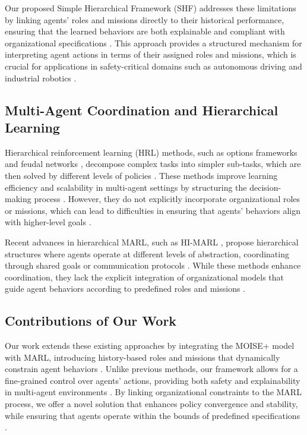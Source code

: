 \documentclass[sigconf,anonymous]{aamas}
\begin{document}
Our proposed Simple Hierarchical Framework (SHF) addresses these limitations by linking agents' roles and missions directly to their historical performance, ensuring that the learned behaviors are both explainable and compliant with organizational specifications \cite{hubner2010moise}. This approach provides a structured mechanism for interpreting agent actions in terms of their assigned roles and missions, which is crucial for applications in safety-critical domains such as autonomous driving and industrial robotics \cite{su2021toward}.

\subsection{Multi-Agent Coordination and Hierarchical Learning}
Hierarchical reinforcement learning (HRL) methods, such as options frameworks \cite{options_hrl_reference} and feudal networks \cite{feudal_rl_reference}, decompose complex tasks into simpler sub-tasks, which are then solved by different levels of policies \cite{foerster2018counterfactual, yang2018mean}. These methods improve learning efficiency and scalability in multi-agent settings by structuring the decision-making process \cite{yang2018mean}. However, they do not explicitly incorporate organizational roles or missions, which can lead to difficulties in ensuring that agents' behaviors align with higher-level goals \cite{hernandez2019survey, hubner2010moise}.

Recent advances in hierarchical MARL, such as HI-MARL \cite{hi_marl_reference}, propose hierarchical structures where agents operate at different levels of abstraction, coordinating through shared goals or communication protocols \cite{foerster2018counterfactual}. While these methods enhance coordination, they lack the explicit integration of organizational models that guide agent behaviors according to predefined roles and missions \cite{hubner2010moise, soule2024}.

\subsection{Contributions of Our Work}
Our work extends these existing approaches by integrating the MOISE+ model with MARL, introducing history-based roles and missions that dynamically constrain agent behaviors \cite{hubner2010moise}. Unlike previous methods, our framework allows for a fine-grained control over agents' actions, providing both safety and explainability in multi-agent environments \cite{ghosal2021explainable}. By linking organizational constraints to the MARL process, we offer a novel solution that enhances policy convergence and stability, while ensuring that agents operate within the bounds of predefined specifications \cite{hubner2010moise, soule2024}.
\end{document}

